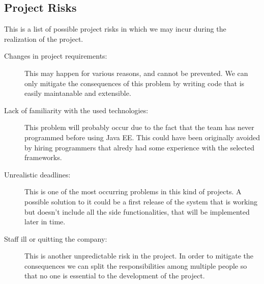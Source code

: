 \subsection{Project Risks}

This is a list of possible project risks in which we may incur during the
realization of the project.

\begin{description}
	\item [Changes in project requirements: ] This may happen for various reasons,
		and cannot be prevented. We can only mitigate the consequences of this
		problem by writing code that is easily maintanable and extensible.
	\item [Lack of familiarity with the used technologies: ] This problem will
		probably occur due to the fact that the team has never programmed before
		using Java EE. This could have been originally avoided by hiring programmers
		that alredy had some experience with the selected frameworks.
	\item [Unrealistic deadlines: ] This is one of the most occurring problems in
		this kind of projects. A possible solution to it could be a first release of
		the system that is working but doesn't include all the side functionalities,
		that will be implemented later in time.
	\item [Staff ill or quitting the company: ] This is another unpredictable risk
		in the project. In order to mitigate the consequences we can split the
		responsibilities among multiple people so that no one is essential to the
		development of the project.
\end{description}
